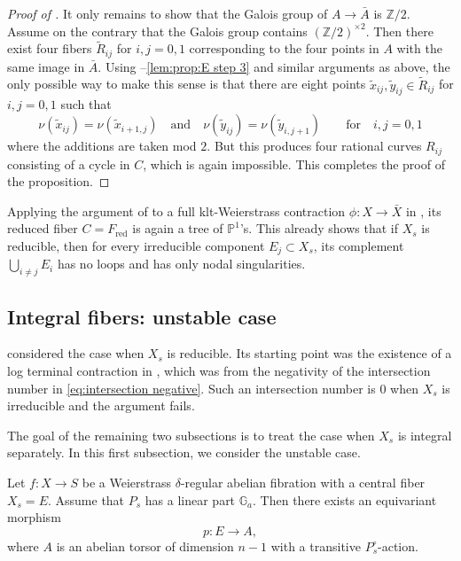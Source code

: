 \documentclass[reqno, letterpaper]{amsart}
\numberwithin{equation}{subsection}
\let\to\longrightarrow
\newcommand{\GG}{\mathbb{G}}
\newcommand{\PP}{\mathbb{P}}
\newcommand{\ZZ}{\mathbb{Z}}
\DeclareMathOperator{\red}{red}
\begin{document}
\begin{proof}[Proof of ]
			\medskip
			
			It only remains to show that the Galois group of $A \to \bar A$ is $\ZZ/2$. Assume on the contrary that the Galois group contains $(\ZZ/2)^{\times 2}$. Then there exist four fibers $\tilde R_{ij}$ for $i,j = 0,1$ corresponding to the four points in $A$ with the same image in $\bar A$. Using --\ref{lem:prop:E step 3} and similar arguments as above, the only possible way to make this sense is that there are eight points $\tilde x_{ij}, \tilde y_{ij} \in \tilde R_{ij}$ for $i,j=0,1$ such that
			\[ \nu(\tilde x_{ij}) = \nu(\tilde x_{i+1, j}) \quad\mbox{and}\quad \nu(\tilde y_{ij}) = \nu(\tilde y_{i, j+1}) \qquad\mbox{for}\quad i,j = 0,1 \]
			where the additions are taken mod $2$. But this produces four rational curves $R_{ij}$ consisting of a cycle in $C$, which is again impossible. This completes the proof of the proposition.
		\end{proof}
		
		\begin{remark}
			Applying the argument of  to a full klt-Weierstrass contraction $\phi : X \to \bar X$ in , its reduced fiber $C = F_{\red}$ is again a tree of $\PP^1$'s. This already shows that if $X_s$ is reducible, then for every irreducible component $E_j \subset X_s$, its complement $\bigcup_{i \neq j} E_i$ has no loops and has only nodal singularities.
		\end{remark}
		
		
		
	\subsection{Integral fibers: unstable case}
		 considered the case when $X_s$ is reducible. Its starting point was the existence of a log terminal contraction in , which was from the negativity of the intersection number in \eqref{eq:intersection negative}. Such an intersection number is $0$ when $X_s$ is irreducible and the argument fails.
		
		The goal of the remaining two subsections is to treat the case when $X_s$ is integral separately. In this first subsection, we consider the unstable case.
		
		\begin{proposition} \label{prop:Weierstrass fiber unstable}
			Let $f : X \to S$ be a Weierstrass $\delta$-regular abelian fibration with a central fiber $X_s = E$. Assume that $P_s$ has a linear part $\GG_a$. Then there exists an equivariant morphism
			\[ p : E \to A ,\]
			where $A$ is an abelian torsor of dimension $n-1$ with a transitive $P^\circ_s$-action.
		\end{proposition}
		
\end{document}

